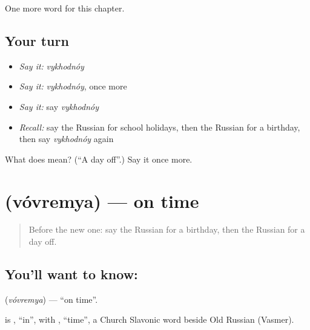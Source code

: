 \begin{grammarlens}[title={What you've built}]
One more word for this chapter.
\end{grammarlens}

\subsection*{Your turn}
\begin{itemize}
\raggedright
  \item \emph{Say it:} \emph{vykhodnóy}
  \item \emph{Say it:} \emph{vykhodnóy}, once more
  \item \emph{Say it:} say \emph{vykhodnóy}
  \item \emph{Recall:} say the Russian for school holidays, then the Russian for a birthday, then say \emph{vykhodnóy} again
\end{itemize}

\begin{tcolorbox}[breakable,colback=teal!4,colframe=teal!35!black,title={Before you move on}]
What does  mean? (\textquotedblleft{}A day off\textquotedblright{}.) Say it once more.
\end{tcolorbox}
\section[\texorpdfstring{\ru{вовремя} (vóvremya)}{вовремя (vóvremya)}]{ (vóvremya) — on time}

\label{lesson:RU-C182-vovremya}



\begin{quote}
Before the new one: say the Russian for a birthday, then the Russian for a day off.
\end{quote}

\subsection*{You'll want to know: }
\textbf{} (\emph{vóvremya}) — \textquotedblleft{}on time\textquotedblright{}.

\begin{cousinweb}
\textbf{} is \emph{}, \textquotedblleft{}in\textquotedblright{}, with \emph{}, \textquotedblleft{}time\textquotedblright{}, a Church Slavonic word beside Old Russian \emph{} (Vasmer).
\end{cousinweb}

